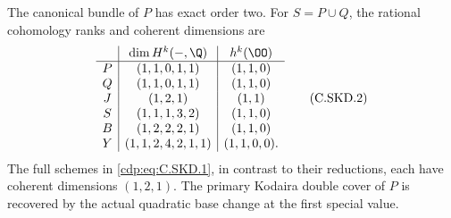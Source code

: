 \begin{proposition}
The canonical bundle of $P$ has exact order two. For
$S=P\cup Q$, the rational cohomology ranks and coherent
dimensions are
\[
 \begin{array}{c|c|c}
 &\dim H^k(-,\Q)&h^k(\OO)\\ \hline
 P&(1,1,0,1,1)&(1,1,0)\\
 Q&(1,1,0,1,1)&(1,1,0)\\
 J&(1,2,1)&(1,1)\\
 S&(1,1,1,3,2)&(1,1,0)\\
 B&(1,2,2,2,1)&(1,1,0)\\
 Y&(1,1,2,4,2,1,1)&(1,1,0,0).
 \end{array}                                             \tag{C.SKD.2}\label{cdp:eq:C.SKD.2}
\]
The full schemes in \eqref{cdp:eq:C.SKD.1}, in contrast to their
reductions, each have coherent dimensions $(1,2,1)$.
The primary Kodaira double cover of $P$ is recovered
by the actual quadratic base change at the first
special value.
\end{proposition}

